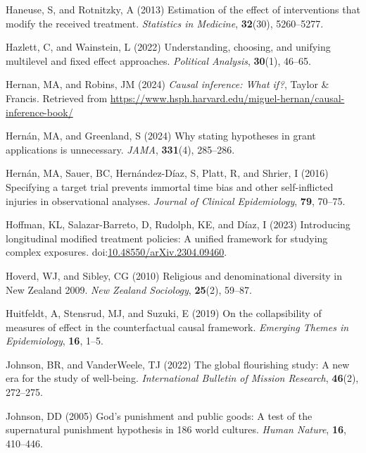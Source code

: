 \documentclass[
  single column]{article}
\newlength{\cslhangindent}
\newenvironment{CSLReferences}[2] %
 {\begin{list}{}{%
  \setlength{\itemindent}{0pt}
  \setlength{\leftmargin}{0pt}
  \setlength{\parsep}{0pt}
  \ifodd #1
   \setlength{\leftmargin}{\cslhangindent}
   \setlength{\itemindent}{-1\cslhangindent}
  \fi
  \setlength{\itemsep}{#2\baselineskip}}}
 {\end{list}}
\begin{document}
\begin{CSLReferences}{1}{0}
Haneuse, S, and Rotnitzky, A (2013) Estimation of the effect of
interventions that modify the received treatment. \emph{Statistics in
Medicine}, \textbf{32}(30), 5260--5277.

Hazlett, C, and Wainstein, L (2022) Understanding, choosing, and
unifying multilevel and fixed effect approaches. \emph{Political
Analysis}, \textbf{30}(1), 46--65.

Hernan, MA, and Robins, JM (2024) \emph{Causal inference: What if?},
Taylor \& Francis. Retrieved from
\url{https://www.hsph.harvard.edu/miguel-hernan/causal-inference-book/}

Hernán, MA, and Greenland, S (2024) Why stating hypotheses in grant
applications is unnecessary. \emph{JAMA}, \textbf{331}(4), 285--286.

Hernán, MA, Sauer, BC, Hernández-Díaz, S, Platt, R, and Shrier, I (2016)
Specifying a target trial prevents immortal time bias and other
self-inflicted injuries in observational analyses. \emph{Journal of
Clinical Epidemiology}, \textbf{79}, 70--75.

Hoffman, KL, Salazar-Barreto, D, Rudolph, KE, and Díaz, I (2023)
Introducing longitudinal modified treatment policies: A unified
framework for studying complex exposures.
doi:\href{https://doi.org/10.48550/arXiv.2304.09460}{10.48550/arXiv.2304.09460}.

Hoverd, WJ, and Sibley, CG (2010) Religious and denominational diversity
in {N}ew {Z}ealand 2009. \emph{New Zealand Sociology}, \textbf{25}(2),
59--87.

Huitfeldt, A, Stensrud, MJ, and Suzuki, E (2019) On the collapsibility
of measures of effect in the counterfactual causal framework.
\emph{Emerging Themes in Epidemiology}, \textbf{16}, 1--5.

Johnson, BR, and VanderWeele, TJ (2022) The global flourishing study: A
new era for the study of well-being. \emph{International Bulletin of
Mission Research}, \textbf{46}(2), 272--275.

Johnson, DD (2005) God{'}s punishment and public goods: A test of the
supernatural punishment hypothesis in 186 world cultures. \emph{Human
Nature}, \textbf{16}, 410--446.


\end{CSLReferences}
\end{document}
